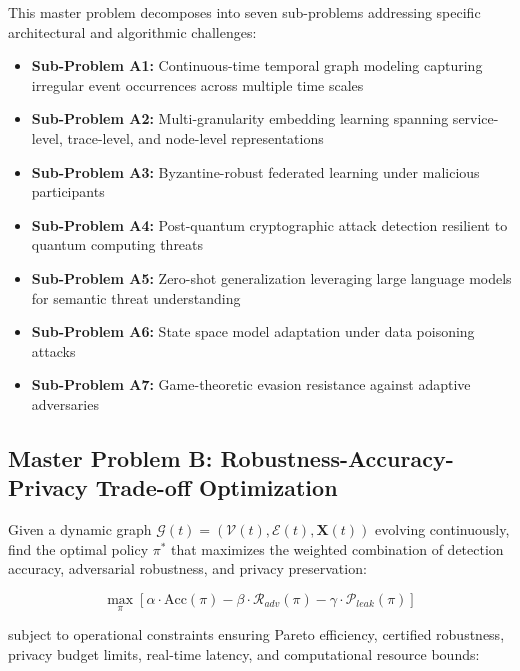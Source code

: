 This master problem decomposes into seven sub-problems addressing specific architectural and algorithmic challenges:

\begin{itemize}[leftmargin=1.5em]
\item \textbf{Sub-Problem A1:} Continuous-time temporal graph modeling capturing irregular event occurrences across multiple time scales
\item \textbf{Sub-Problem A2:} Multi-granularity embedding learning spanning service-level, trace-level, and node-level representations
\item \textbf{Sub-Problem A3:} Byzantine-robust federated learning under malicious participants
\item \textbf{Sub-Problem A4:} Post-quantum cryptographic attack detection resilient to quantum computing threats
\item \textbf{Sub-Problem A5:} Zero-shot generalization leveraging large language models for semantic threat understanding
\item \textbf{Sub-Problem A6:} State space model adaptation under data poisoning attacks
\item \textbf{Sub-Problem A7:} Game-theoretic evasion resistance against adaptive adversaries
\end{itemize}

\subsection*{Master Problem B: Robustness-Accuracy-Privacy Trade-off Optimization}

Given a dynamic graph $\mathcal{G}(t) = (\mathcal{V}(t), \mathcal{E}(t), \mathbf{X}(t))$ evolving continuously, find the optimal policy $\pi^*$ that maximizes the weighted combination of detection accuracy, adversarial robustness, and privacy preservation:

\begin{equation}
\max_\pi \left[ \alpha \cdot \text{Acc}(\pi) - \beta \cdot \mathcal{R}_{adv}(\pi) - \gamma \cdot \mathcal{P}_{leak}(\pi) \right]
\end{equation}

subject to operational constraints ensuring Pareto efficiency, certified robustness, privacy budget limits, real-time latency, and computational resource bounds:

